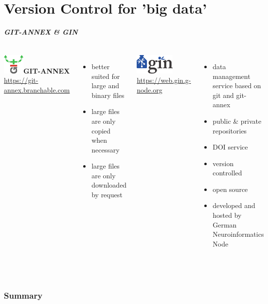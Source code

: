 \documentclass[
t, %
10pt, %
aspectratio=1610, %
ngerman,
english,
]{beamer}
\begin{document}
\part{Version Control for 'big data'}
\makepart

\begin{frame}
    \frametitle{GIT-ANNEX \& GIN}
    \begin{columns}
	\includegraphics[height=1cm]{graphics/gitannex_logo}\textbf{GIT-ANNEX}\\
	\url{https://git-annex.branchable.com}\\
	\begin{itemize}
	    \item better suited for large and binary files
	    \item large files are only copied when necessary
	    \item large files are only downloaded by request
	\end{itemize}
	\includegraphics[height=1cm]{graphics/GinLogo}\\
	\url{https://web.gin.g-node.org}\\
	\begin{itemize}
	    \item data management service based on git and git-annex
	    \item public \& private repositories
	    \item DOI service
	    \item version controlled
	    \item open source
	    \item developed and hosted by German Neuroinformatics Node
	\end{itemize}
    \end{columns}\\
\end{frame}


\section{Summary}
\end{document}
